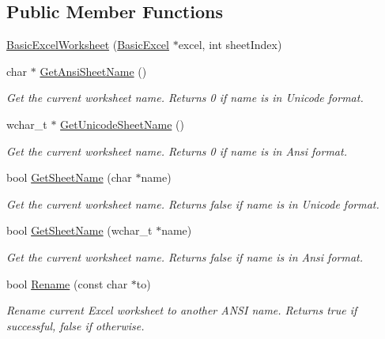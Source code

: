 \subsection*{Public Member Functions}
\begin{DoxyCompactItemize}
\item 
\hyperlink{class_y_excel_1_1_basic_excel_worksheet_a5b2b6fc3712e8e8742336ea058dc5a9c}{Basic\+Excel\+Worksheet} (\hyperlink{class_y_excel_1_1_basic_excel}{Basic\+Excel} $\ast$excel, int sheet\+Index)
\item 
char $\ast$ \hyperlink{class_y_excel_1_1_basic_excel_worksheet_a2f0abeef48f26681e84752a8c4bc304a}{Get\+Ansi\+Sheet\+Name} ()
\begin{DoxyCompactList}\small\item\em Get the current worksheet name. Returns 0 if name is in Unicode format. \end{DoxyCompactList}\item 
wchar\+\_\+t $\ast$ \hyperlink{class_y_excel_1_1_basic_excel_worksheet_a5b01bb1fcbd076e10bddba641f086a95}{Get\+Unicode\+Sheet\+Name} ()
\begin{DoxyCompactList}\small\item\em Get the current worksheet name. Returns 0 if name is in Ansi format. \end{DoxyCompactList}\item 
bool \hyperlink{class_y_excel_1_1_basic_excel_worksheet_a8f15128ba07fe3864ed0e0478a823baa}{Get\+Sheet\+Name} (char $\ast$name)
\begin{DoxyCompactList}\small\item\em Get the current worksheet name. Returns false if name is in Unicode format. \end{DoxyCompactList}\item 
bool \hyperlink{class_y_excel_1_1_basic_excel_worksheet_adb4f97665b32ce8501dbfebcded117a4}{Get\+Sheet\+Name} (wchar\+\_\+t $\ast$name)
\begin{DoxyCompactList}\small\item\em Get the current worksheet name. Returns false if name is in Ansi format. \end{DoxyCompactList}\item 
bool \hyperlink{class_y_excel_1_1_basic_excel_worksheet_a3258a153e308a91b9b48574bdf6aaa39}{Rename} (const char $\ast$to)
\begin{DoxyCompactList}\small\item\em Rename current Excel worksheet to another A\+N\+S\+I name. Returns true if successful, false if otherwise. \end{DoxyCompactList}\item 

\end{DoxyCompactItemize}
